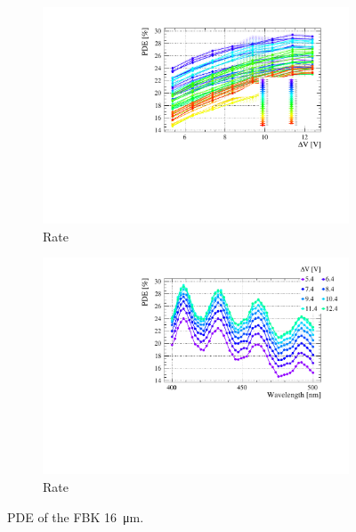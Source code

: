 \begin{landscape}
\begin{figure}[htbp]
\begin{subfigure}{0.65\textwidth}
        \includegraphics[width=\linewidth]{gfx/plots/PDE/16/c_Freq_Bias.pdf}    
        \caption{Rate}
    \end{subfigure}
    \begin{subfigure}{0.65\textwidth}
        \includegraphics[width=\linewidth]{gfx/plots/PDE/16/c_Freq_Wavelength.pdf} 
        \caption{Rate}
    \end{subfigure}
    \caption{PDE of the FBK \SI{16}{\micro m}.}
    \label{fig:pde 16um}
\end{figure}

\end{landscape}


